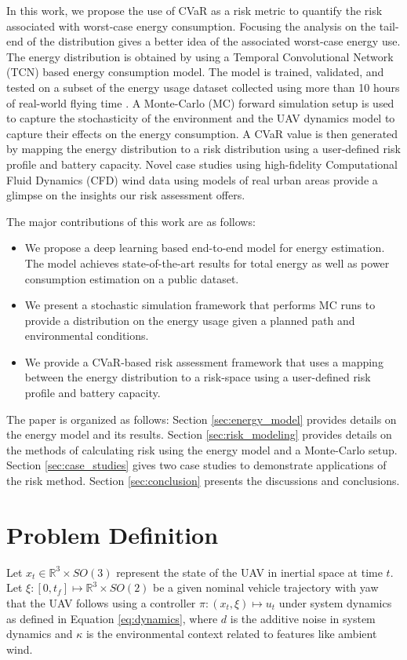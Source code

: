 \documentclass[letterpaper, 10 pt, conference]{ieeeconf}
\begin{document}
\par In this work, we propose the use of CVaR as a risk metric to quantify the risk associated with worst-case energy consumption. Focusing the analysis on the tail-end of the distribution gives a better idea of the associated worst-case energy use. The energy distribution is obtained by using a Temporal Convolutional Network (TCN) based energy consumption model. The model is trained, validated, and tested on a subset of the energy usage dataset collected using more than 10 hours of real-world flying time \cite{rodrigues2021inflight, Rodrigues}. A Monte-Carlo (MC) forward simulation setup is used to capture the stochasticity of the environment and the UAV dynamics model to capture their effects on the energy consumption. A CVaR value is then generated by mapping the energy distribution to a risk distribution using a user-defined risk profile and battery capacity. Novel case studies using high-fidelity Computational Fluid Dynamics (CFD) wind data using models of real urban areas provide a glimpse on the insights our risk assessment offers. 

\par The major contributions of this work are as follows:
\begin{itemize}
    \item We propose a deep learning based end-to-end model for energy estimation. The model achieves state-of-the-art results for total energy as well as power consumption estimation on a public dataset.
    \item We present a stochastic simulation framework that performs MC runs to provide a distribution on the energy usage given a planned path and environmental conditions.
    \item We provide a CVaR-based risk assessment framework that uses a mapping between the energy distribution to a risk-space using a user-defined risk profile and battery capacity.  
\end{itemize}

\par The paper is organized as follows: Section \ref{sec:energy_model} provides details on the energy model and its results. Section \ref{sec:risk_modeling} provides details on the methods of calculating risk using the energy model and a Monte-Carlo setup. Section \ref{sec:case_studies} gives two case studies to demonstrate applications of the risk method. Section \ref{sec:conclusion} presents the discussions and conclusions. 


\section{Problem Definition}
\label{sec:problem}
Let ${x_t} \in \mathbb{R}^3 \times SO(3)$ represent the state of the UAV in inertial space at time $t$. Let $\xi: [0,t_f] \mapsto \mathbb{R}^3 \times SO(2)$ be a given nominal vehicle trajectory with yaw that the UAV follows using a controller $\pi:(x_t,\xi) \mapsto u_t$ under system dynamics as defined in Equation \ref{eq:dynamics}, where $d$ is the additive noise in system dynamics and $\kappa$ is the environmental context related to features like ambient wind. 
\end{document}
